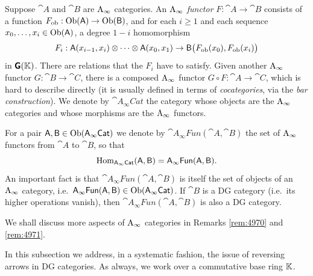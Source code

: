 \begin{rem}
Suppose $\cat{A}$ and $\cat{B}$ are $\mathrm{A}_{\infty}$ categories. 
An {\em $\mathrm{A}_{\infty}$ functor} $F : \cat{A} \to \cat{B}$
consists of a function
$F_{\mathrm{ob}} : \operatorname{Ob}(\operatorname{\mathsf{A}}) \to \operatorname{Ob}(\operatorname{\mathsf{B}})$, 
and for each $i \geq 1$ and each sequence 
$x_0, \ldots, x_i \in \operatorname{Ob}(\operatorname{\mathsf{A}})$, a degree $1 - i$ homomorphism
\begin{equation} \label{4961}
F_i : \operatorname{\mathsf{A}}(x_{i - 1}, x_{i}) \otimes \cdots \otimes  \operatorname{\mathsf{A}}(x_{0}, x_{1}) \to 
\operatorname{\mathsf{B}} \bigl( F_{\mathrm{ob}}(x_{0}), F_{\mathrm{ob}}(x_{i}) \bigr) 
\end{equation}
in $\boldsymbol{\mathsf{G}}(\mathbb{K})$. 
There are relations that the $F_i$ have to satisfy.
Given another $\mathrm{A}_{\infty}$ functor $G : \cat{B} \to \cat{C}$, 
there is a composed $\mathrm{A}_{\infty}$ functor
$G \circ F : \cat{A} \to \cat{C}$, which is hard to describe directly (it is 
usually defined in terms of {\em cocategories}, via the {\em bar 
construction}). 
We denote by $\cat{A_{\infty}Cat}$ the category whose objects are the 
$\mathrm{A}_{\infty}$ categories and whose morphisms are the $\mathrm{A}_{\infty}$ 
functors.  

For a pair $\operatorname{\mathsf{A}}, \operatorname{\mathsf{B}} \in \operatorname{Ob}(\operatorname{\mathsf{A_{\infty}Cat}})$
we denote by  $\cat{A_{\infty}Fun}(\cat{A}, \cat{B})$ 
the set of $\mathrm{A}_{\infty}$ functors from $\cat{A}$ to $\cat{B}$, so 
that \begin{equation} \label{eqn:4970}
\operatorname{Hom}_{\operatorname{\mathsf{A_{\infty}Cat}}}(\operatorname{\mathsf{A}}, \operatorname{\mathsf{B}}) =
\operatorname{\mathsf{A_{\infty}Fun}}(\operatorname{\mathsf{A}}, \operatorname{\mathsf{B}}) . 
\end{equation}
An important fact is that 
$\cat{A_{\infty}Fun}(\cat{A}, \cat{B})$
is itself the set of objects of an $\mathrm{A}_{\infty}$ category, i.e.\ 
$\operatorname{\mathsf{A_{\infty}Fun}}(\operatorname{\mathsf{A}}, \operatorname{\mathsf{B}}) \in \operatorname{Ob}(\operatorname{\mathsf{A_{\infty}Cat}})$. 
If $\cat{B}$ is a DG category (i.e.\ its higher operations vanish), then 
$\cat{A_{\infty}Fun}(\cat{A}, \cat{B})$
is also a DG category.

We shall discuss more aspects of $\mathrm{A}_{\infty}$ categories in Remarks 
\ref{rem:4970} and \ref{rem:4971}. 
\end{rem}





 \label{subsec:contrvar-dg-func}

In this subsection we address, in a systematic fashion, the issue of reversing 
arrows in DG categories. As always, we work over a commutative base ring $\mathbb{K}$. 
 
